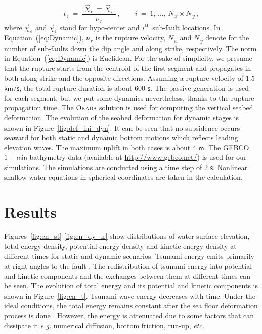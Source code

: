 \documentclass[12pt]{llncs}
\begin{document}
\begin{equation}\label{eq:Dynamic}
  t_{\,i}\ =\ \frac{\Vert\vec{\chi}_{\,e}\ -\ \vec{\chi}_{\,i}\Vert}{\nu_{\,r}}\,,\qquad \textit{i}\ =\ 1,\,\ldots,\,N_{\,x} \times N_{\,y}\,,
\end{equation}
where $\vec{\chi}_{\,e}$ and $\vec{\chi}_{\,i}$ stand for hypo-center and \textit{i}${}^{\,\mathrm{th}}$ sub-fault locations. In Equation~(\ref{eq:Dynamic}), $\nu_{\,r}$ is the rupture velocity, $N_{\,x}$ and $N_{\,y}$ denote for the number of sub-faults down the dip angle and along strike, respectively. The norm in Equation~(\ref{eq:Dynamic}) is Euclidean. For the sake of simplicity, we presume that the rupture starts from the centroid of the first segment and propagates in both along-strike and the opposite directions. Assuming a rupture velocity of $1.5$ $\mathsf{km/s}$, the total rupture duration is about $600$ $\mathsf{s}$. The passive generation is used for each segment, but we put some dynamics nevertheless, thanks to the rupture propagation time. The \textsc{Okada} solution \citep{Okada85} is used for computing the vertical seabed deformation. The evolution of the seabed deformation for dynamic stages is shown in Figure~\ref{fig:def_ini_dyn}. It can be seen that no subsidence occurs seaward for both static and dynamic bottom motions which reflects leading elevation waves. The maximum uplift in both cases is about $4$ $\mathsf{m}$. The GEBCO $1-\mathsf{min}$ bathymetry data (available at \url{http://www.gebco.net/}) is used for our simulations. The simulations are conducted using a time step of $2$ $\mathsf{s}$. Nonlinear shallow water equations in spherical coordinates are taken in the calculation.
%
%
\section{Results}
Figures~\ref{fig:en_st}-\ref{fig:en_dy_lr} show distributions of water surface elevation, total energy density, potential energy density and kinetic energy density at different times for static and dynamic scenarios. Tsunami energy emits primarily at right angles to the fault \citep{Kajiura1970, Ben-M}. The redistribution of tsunami energy into potential and kinetic components and the exchanges between them at different times can be seen. The evolution of total energy and its potential and kinetic components is shown in Figure~\ref{fig:en_t}. Tsunami wave energy decreases with time. Under the ideal conditions, the total energy remains constant after the sea floor deformation process is done \citep{Dutykh2009b}. However, the energy is attenuated due to some factors that can dissipate it \emph{e.g.} numerical diffusion, bottom friction, run-up, \emph{etc.} 
\end{document}
